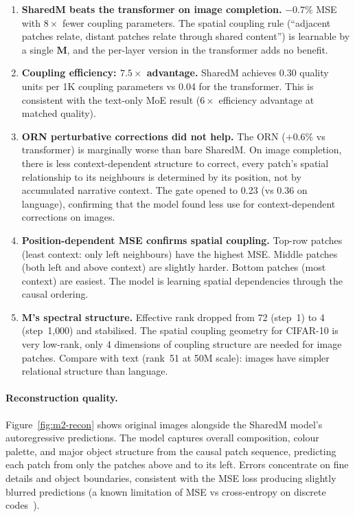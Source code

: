 \documentclass[11pt, a4paper]{article}
\newcommand{\M}{\mathbf{M}}
\theoremstyle{plain}
\theoremstyle{remark}
\begin{document}
\begin{enumerate}[nosep]
    \item \textbf{SharedM beats the transformer on image completion.} $-0.7\%$ MSE with $8\times$ fewer coupling parameters. The spatial coupling rule (``adjacent patches relate, distant patches relate through shared content'') is learnable by a single $\M$, and the per-layer version in the transformer adds no benefit.

    \item \textbf{Coupling efficiency: $7.5\times$ advantage.} SharedM achieves 0.30 quality units per 1K coupling parameters vs 0.04 for the transformer. This is consistent with the text-only MoE result ($6\times$ efficiency advantage at matched quality).

    \item \textbf{ORN perturbative corrections did not help.} The ORN ($+0.6\%$ vs transformer) is marginally worse than bare SharedM. On image completion, there is less context-dependent structure to correct, every patch's spatial relationship to its neighbours is determined by its position, not by accumulated narrative context. The gate opened to 0.23 (vs 0.36 on language), confirming that the model found less use for context-dependent corrections on images.

    \item \textbf{Position-dependent MSE confirms spatial coupling.} Top-row patches (least context: only left neighbours) have the highest MSE. Middle patches (both left and above context) are slightly harder. Bottom patches (most context) are easiest. The model is learning spatial dependencies through the causal ordering.

    \item \textbf{$\M$'s spectral structure.} Effective rank dropped from 72 (step~1) to 4 (step~1{,}000) and stabilised. The spatial coupling geometry for CIFAR-10 is very low-rank, only 4 dimensions of coupling structure are needed for image patches. Compare with text (rank~51 at 50M scale): images have simpler relational structure than language.
\end{enumerate}

\paragraph{Reconstruction quality.}
Figure~\ref{fig:m2-recon} shows original images alongside the SharedM model's autoregressive predictions.
The model captures overall composition, colour palette, and major object structure from the causal patch sequence, predicting each patch from only the patches above and to its left.
Errors concentrate on fine details and object boundaries, consistent with the MSE loss producing slightly blurred predictions (a known limitation of MSE vs cross-entropy on discrete codes~\cite{chen2020igpt}).
\end{document}
